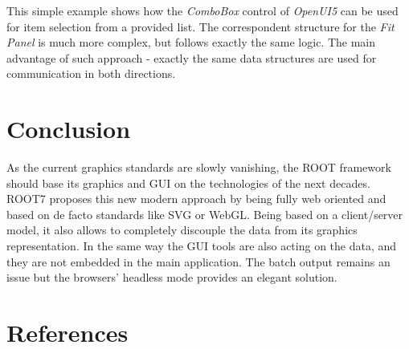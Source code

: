\documentclass[a4paper]{jpconf}
\begin{document}
This simple example shows how the \textit{ComboBox} control of \textit{OpenUI5} can be used for item selection from a provided list.
The correspondent structure for the \textit{Fit Panel} is much more complex, but follows exactly the same logic.
The main advantage of such approach - exactly the same data structures are used for communication in both directions.


\section{Conclusion}

As the current graphics standards are slowly vanishing, the ROOT framework should
base its graphics and GUI on the technologies of the next decades. ROOT7 proposes
this new modern approach by being fully web oriented and based on de facto standards
like SVG or WebGL. Being based on a client/server model, it also allows to completely
discouple the data from its graphics representation. In the same way the GUI tools
are also acting on the data, and they are not embedded in the main application.
The batch output remains an issue but the browsers' headless mode provides an elegant solution.


\section{References}

\end{document}
